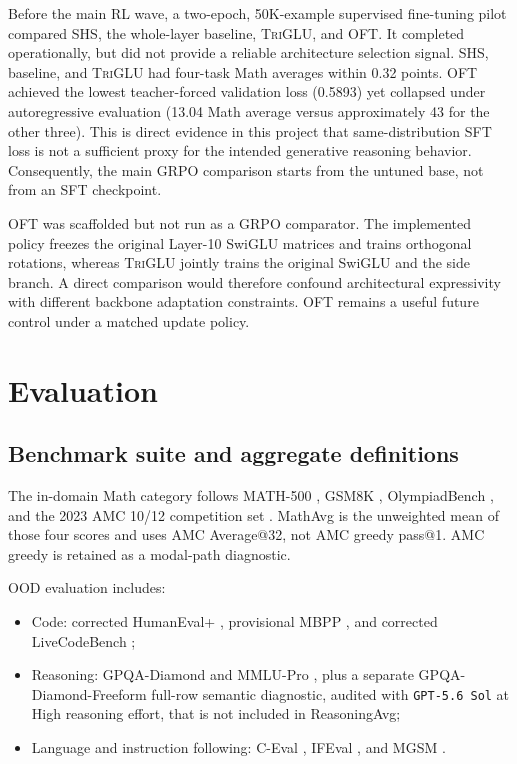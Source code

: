 \documentclass[10pt]{article}
\newcommand{\TriGLU}{\textsc{TriGLU}}
\begin{document}
Before the main RL wave, a two-epoch, 50K-example supervised fine-tuning pilot
compared SHS, the whole-layer baseline, \TriGLU{}, and OFT.  It completed
operationally, but did not provide a reliable architecture selection signal.
SHS, baseline, and \TriGLU{} had four-task Math averages within 0.32 points.
OFT achieved the lowest teacher-forced validation loss (0.5893) yet collapsed
under autoregressive evaluation (13.04 Math average versus approximately 43
for the other three).  This is direct evidence in this project that
same-distribution SFT loss is not a sufficient proxy for the intended
generative reasoning behavior.  Consequently, the main GRPO comparison starts
from the untuned base, not from an SFT checkpoint.

OFT \citep{qiu2023oft} was scaffolded but not run as a GRPO comparator.  The
implemented policy freezes the original Layer-10 SwiGLU matrices and trains
orthogonal rotations, whereas \TriGLU{} jointly trains the original SwiGLU and
the side branch.  A direct comparison would therefore confound architectural
expressivity with different backbone adaptation constraints.  OFT remains a
useful future control under a matched update policy.

\section{Evaluation}

\subsection{Benchmark suite and aggregate definitions}

The in-domain Math category follows MATH-500 \citep{hendrycks2021math}, GSM8K
\citep{cobbe2021gsm8k}, OlympiadBench \citep{he2024olympiadbench}, and the
2023 AMC 10/12 competition set \citep{maa2023amc}.  MathAvg is the unweighted
mean of those four scores and uses AMC
Average@32, not AMC greedy pass@1.  AMC greedy is retained as a modal-path
diagnostic.

OOD evaluation includes:
\begin{itemize}
  \item Code: corrected HumanEval+ \citep{liu2023evalplus}, provisional MBPP
        \citep{austin2021mbpp}, and corrected LiveCodeBench
        \citep{jain2024livecodebench};
  \item Reasoning: GPQA-Diamond \citep{rein2023gpqa} and MMLU-Pro
        \citep{wang2024mmlupro}, plus a separate GPQA-Diamond-Freeform
        full-row semantic diagnostic, audited with \texttt{GPT-5.6 Sol} at High
        reasoning effort, that is not included in ReasoningAvg;
  \item Language and instruction following: C-Eval \citep{huang2023ceval},
        IFEval \citep{zhou2023ifeval}, and MGSM \citep{shi2022mgsm}.
\end{itemize}
\end{document}
